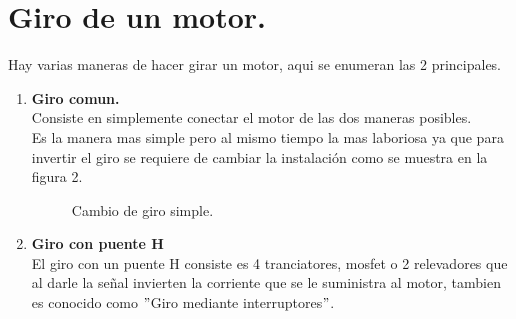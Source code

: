 \documentclass[letterpaper]{article}
\begin{document}
\section{Giro de un motor.}
Hay varias maneras de hacer girar un motor, aqui se enumeran las 2 principales.
\begin{enumerate}
    \item \textbf{Giro comun.}\\
    Consiste en simplemente conectar el motor de las dos maneras posibles.\\
    Es la manera mas simple pero al mismo tiempo la mas laboriosa ya que para invertir el giro se requiere de cambiar la instalación como se muestra en la figura 2.\\
    \begin{figure}[htbp]
        \centering
        \caption{Cambio de giro simple.}
        \label{fig:motor_gir1}
    \end{figure}
    \item \textbf{Giro con puente H}\\
    El giro con un puente H consiste es 4 tranciatores, mosfet o 2 relevadores que al darle la señal invierten la corriente que se le suministra al motor, tambien es conocido como $"$Giro mediante interruptores$"$.

\end{enumerate}
\end{document}
